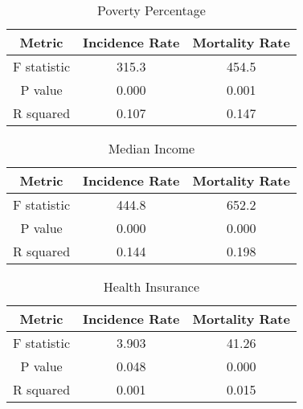 \documentclass[conference]{IEEEtran}
\begin{document}
\begin{table}[h!]
  \begin{center}
    \caption{{Poverty Percentage}}
    \label{tab:table1}
    \begin{tabular}{c|c|c} %
      \textbf{Metric} & \textbf{Incidence Rate} & \textbf{Mortality Rate}\\
      \hline
      F statistic & 315.3 & 454.5\\
      P value & 0.000 & 0.001\\
      R squared & 0.107 & 0.147\\
    \end{tabular}
  \end{center}
\end{table}

\begin{table}[h!]
  \begin{center}
    \caption{{Median Income}}
    \label{tab:table1}
    \begin{tabular}{c|c|c} %
      \textbf{Metric} & \textbf{Incidence Rate} & \textbf{Mortality Rate}\\
      \hline
      F statistic & 444.8 & 652.2\\
      P value & 0.000 & 0.000\\
      R squared & 0.144 & 0.198\\
    \end{tabular}
  \end{center}
\end{table}

\begin{table}[h!]
  \begin{center}
    \caption{{Health Insurance}}
    \label{tab:table1}
    \begin{tabular}{c|c|c} %
      \textbf{Metric} & \textbf{Incidence Rate} & \textbf{Mortality Rate}\\
      \hline
      F statistic & 3.903 & 41.26\\
      P value & 0.048 & 0.000\\
      R squared & 0.001 & 0.015\\
    \end{tabular}
  \end{center}
\end{table}
\end{document}
